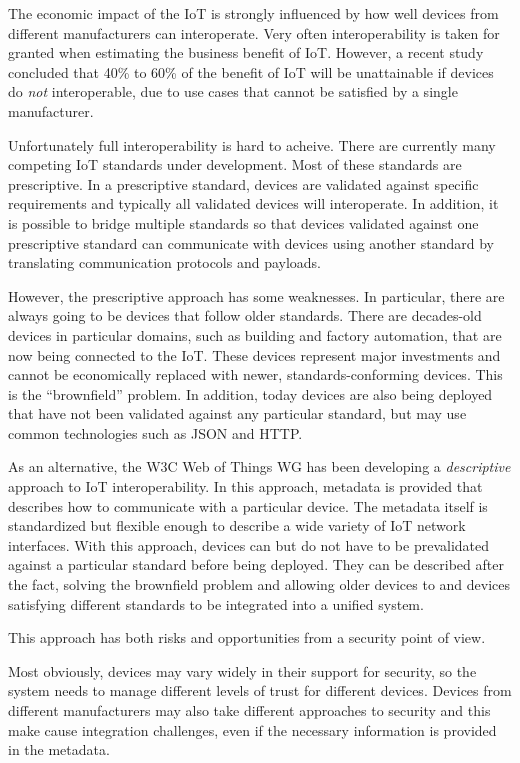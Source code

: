 The economic impact of the IoT is strongly influenced by how well devices from 
different manufacturers can interoperate.
Very often interoperability is taken for granted when estimating the business
benefit of IoT. 
However, a recent study \cite{McKinley2015}
concluded that 40\% to 60\% of the 
benefit of IoT will be unattainable if devices do \emph{not} interoperable,
due to use cases that cannot be satisfied by a single manufacturer.

Unfortunately full interoperability is hard to acheive.
There are currently many competing IoT standards under development.
Most of these standards are prescriptive.
In a prescriptive standard, devices are validated against specific requirements
and typically all validated devices will interoperate.
In addition, it is possible to bridge multiple standards so that
devices validated against one prescriptive standard can communicate with
devices using another standard by translating communication protocols and payloads.

However, the prescriptive approach has some weaknesses.
In particular, there are always going to be devices that follow older standards.
There are decades-old devices in particular domains, such as building and factory
automation, that are now being connected to the IoT.
These devices represent major investments and cannot be economically replaced with newer,
standards-conforming devices.  This is the ``brownfield'' problem.
In addition, today devices are also being deployed that have not been validated
against any particular standard, but may use common technologies such as JSON and HTTP.

As an alternative, the W3C Web of Things WG has been developing a \emph{descriptive} 
approach to IoT interoperability.
In this approach,
metadata is provided that describes how to communicate with a 
particular device.
The metadata itself is standardized but flexible enough to describe a wide variety of
IoT network interfaces.
With this approach, devices can but do not have to be prevalidated against 
a particular standard before being deployed.
They can be described after the fact, solving the brownfield problem and allowing
older devices to and devices satisfying different standards to be integrated into
a unified system.  

This approach has both risks and opportunities from a security point of view.

Most obviously, devices may vary widely in their support for security,
so the system needs to manage different levels of trust for different devices.
Devices from different manufacturers may also take different approaches to
security and this make cause integration challenges, even if the necessary
information is provided in the metadata.

